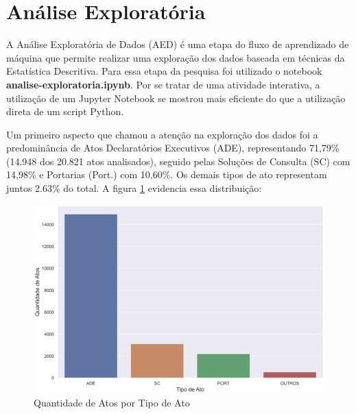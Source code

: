 \section{Análise Exploratória}

A Análise Exploratória de Dados (AED) é uma etapa do fluxo de aprendizado de máquina que permite realizar uma exploração dos dados baseada em técnicas da Estatística Descritiva. Para essa etapa da pesquisa foi utilizado o notebook \textbf{analise-exploratoria.ipynb}. Por se tratar de uma atividade interativa, a utilização de um Jupyter Notebook se mostrou mais eficiente do que a utilização direta de um script Python.

Um primeiro aspecto que chamou a atenção na exploração dos dados foi a predominância de Atos Declaratórios Executivos (ADE), representando 71,79\% (14.948 dos 20.821 atos analisados), seguido pelas Soluções de Consulta (SC) com 14,98\% e Portarias (Port.) com 10,60\%. Os demais tipos de ato representam juntos 2.63\% do total. A figura \ref{fig:atos-por-tipo-ato} evidencia essa distribuição:

\begin{figure}[h]
	\caption{Quantidade de Atos por Tipo de Ato}
	\center
	\label{fig:atos-por-tipo-ato}
	\includegraphics[scale=1.7]{exploratoria/atos-por-tipo-ato.png}
	\fdp
\end{figure}